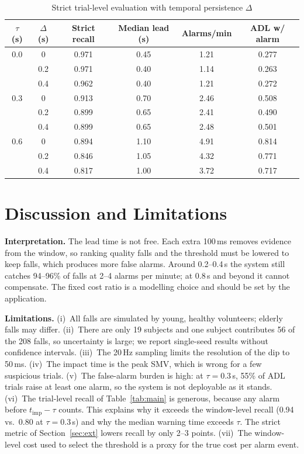 \documentclass[conference]{IEEEtran}
\begin{document}
\begin{table}[t]
\caption{Strict trial-level evaluation with temporal persistence $\Delta$}
\label{tab:ext}
\centering
\footnotesize
\begin{tabular}{@{}cccccc@{}}
\toprule
$\tau$ (s) & $\Delta$ (s) & Strict recall & Median lead (s) & Alarms/min & ADL w/ alarm \\
\midrule
0.0 & 0   & 0.971 & 0.45 & 1.21 & 0.277 \\
    & 0.2 & 0.971 & 0.40 & 1.14 & 0.263 \\
    & 0.4 & 0.962 & 0.40 & 1.21 & 0.272 \\
\midrule
0.3 & 0   & 0.913 & 0.70 & 2.46 & 0.508 \\
    & 0.2 & 0.899 & 0.65 & 2.41 & 0.490 \\
    & 0.4 & 0.899 & 0.65 & 2.48 & 0.501 \\
\midrule
0.6 & 0   & 0.894 & 1.10 & 4.91 & 0.814 \\
    & 0.2 & 0.846 & 1.05 & 4.32 & 0.771 \\
    & 0.4 & 0.817 & 1.00 & 3.72 & 0.717 \\
\bottomrule
\end{tabular}
\end{table}

\section{Discussion and Limitations}\label{sec:limits}
\textbf{Interpretation.} The lead time is not free. Each extra 100\,ms removes evidence from the window, so ranking quality falls and the threshold must be lowered to keep falls, which produces more false alarms. Around 0.2--0.4\,s the system still catches 94--96\% of falls at 2--4 alarms per minute; at 0.8\,s and beyond it cannot compensate. The fixed cost ratio is a modelling choice and should be set by the application.

\textbf{Limitations.} (i)~All falls are simulated by young, healthy volunteers; elderly falls may differ. (ii)~There are only 19 subjects and one subject contributes 56 of the 208 falls, so uncertainty is large; we report single-seed results without confidence intervals. (iii)~The 20\,Hz sampling limits the resolution of the dip to 50\,ms. (iv)~The impact time is the peak SMV, which is wrong for a few suspicious trials. (v)~The false-alarm burden is high: at $\tau=0.3$\,s, 55\% of ADL trials raise at least one alarm, so the system is not deployable as it stands. (vi)~The trial-level recall of Table~\ref{tab:main} is generous, because any alarm before $t_{\mathrm{imp}}-\tau$ counts. This explains why it exceeds the window-level recall (0.94 vs.\ 0.80 at $\tau=0.3$\,s) and why the median warning time exceeds $\tau$. The strict metric of Section~\ref{sec:ext} lowers recall by only 2--3 points. (vii)~The window-level cost used to select the threshold is a proxy for the true cost per alarm event.
\end{document}
